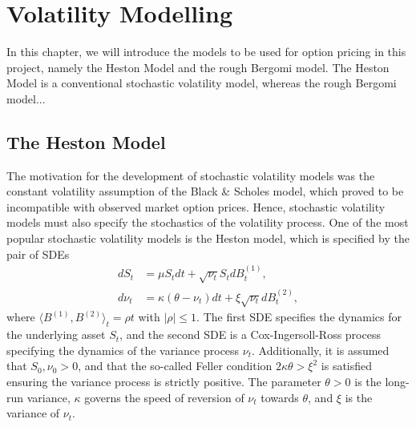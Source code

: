 \chapter{Volatility Modelling}
In this chapter, we will introduce the models to be used for option pricing in this project, namely the Heston Model and the rough Bergomi model. The Heston Model is a conventional stochastic volatility model, whereas the rough Bergomi model... 
\section{The Heston Model}
The motivation for the development of stochastic volatility models was the constant volatility assumption of the Black \& Scholes model, which proved to be incompatible with observed market option prices. Hence, stochastic volatility models must also specify the stochastics of the volatility process. One of the most popular stochastic volatility models is the Heston model, which is specified by the pair of SDEs
\begin{align}
    dS_{t}&= \mu S_{t}dt + \sqrt{\nu_{t}}S_{t}dB_{t}^{(1)},\\
    d\nu_{t}&= \kappa(\theta - \nu_{t})dt + \xi\sqrt{\nu_{t}}dB_{t}^{(2)},
\end{align}
where $\langle B^{(1)},B^{(2)}\rangle_{t}=\rho t$ with $|\rho|\leq 1$. The first SDE specifies the dynamics for the underlying asset $S_{t}$, and the second SDE is a Cox-Ingersoll-Ross process specifying the dynamics of the variance process $\nu_{t}$. Additionally, it is assumed that $S_{0},\nu_{0}>0$, and that the so-called Feller condition $2\kappa\theta >\xi^{2}$ is satisfied ensuring the variance process is strictly positive. The parameter $\theta>0$ is the long-run variance, $\kappa$ governs the speed of reversion of $\nu_{t}$ towards $\theta$, and $\xi$ is the variance of $\nu_{t}$.

